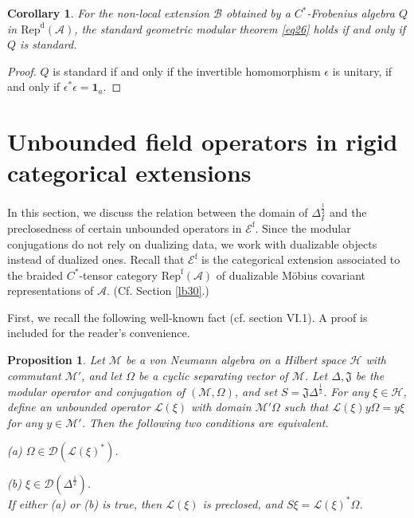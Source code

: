 \documentclass[12pt,a4paper]{article}
\theoremstyle{definition}
\theoremstyle{plain}
\newtheorem{pp}[df]{Proposition}
\newtheorem{co}[df]{Corollary}
\newcommand{\fk}{\mathfrak}
\newcommand{\mc}{\mathcal}
\newcommand{\id}{\mathbf{1}}
\newcommand{\Dom}{\scr D}
\newcommand{\scr}{\mathscr}
\newcommand{\RepdA}{\mathrm{Rep}^{\mathrm d}(\mc A)}
\newcommand{\RepfA}{\mathrm{Rep}^{\mathrm f}(\mc A)}
\newcommand{\Ef}{\mathscr E^{\mathrm f}}
\numberwithin{equation}{section}
\begin{document}
\begin{co}
For the non-local extension $\mc B$ obtained by a $C^*$-Frobenius algebra $Q$ in $\RepdA$, the standard geometric modular theorem \eqref{eq26} holds if and only if $Q$ is standard.
\end{co}

\begin{proof}
$Q$ is standard if and only if the invertible homomorphism $\epsilon$ is unitary, if and only if $\epsilon^*\epsilon=\id_a$.
\end{proof}






\section{Unbounded field operators in rigid categorical extensions}


In this section, we discuss the relation between the domain of $\Delta_I^{\frac 12}$ and the preclosedness of certain unbounded operators in $\Ef$. Since the modular conjugations do not rely on dualizing data, we work with dualizable objects instead of dualized ones. Recall that $\Ef$ is the categorical extension associated to the braided $C^*$-tensor category $\RepfA$ of dualizable M\"obius covariant representations of $\mc A$. (Cf. Section \ref{lb30}.)

First, we recall the following well-known fact (cf. \cite{Tak02} section VI.1). A proof is included for the reader's convenience.

\begin{pp}\label{lb17}
Let $\mc M$ be a von Neumann algebra on a Hilbert space $\mc H$ with commutant $\mc M'$, and let $\Omega$ be a cyclic separating vector of $\mc M$. Let $\Delta,\fk J$ be the modular operator and conjugation of $(\mc M,\Omega)$, and set $S=\fk J\Delta^{\frac 12}$. For any $\xi\in\mc H$, define an unbounded operator $\scr L(\xi)$ with domain $\mc M'\Omega$ such that $\scr L(\xi)y\Omega=y\xi$ for any $y\in\mc M'$. Then the following two conditions are equivalent.

(a) $\Omega\in\Dom(\scr L(\xi)^*)$.

(b) $\xi\in\Dom(\Delta^{\frac 12})$. \\
If either  (a) or (b) is true, then $\scr L(\xi)$ is preclosed, and $S\xi=\scr L(\xi)^*\Omega$.
\end{pp}
\end{document}
